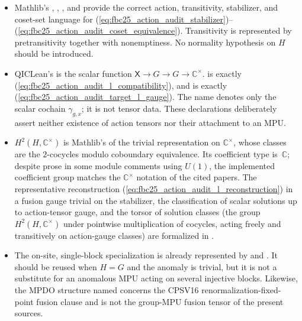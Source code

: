\documentclass{article}
\begin{document}
\begin{itemize}
    \item Mathlib's ,
          ,
          , and
           provide the correct
          action, transitivity, stabilizer, and coset-set language for
          (\ref{eq:fbc25_action_audit_stabilizer})--
          (\ref{eq:fbc25_action_audit_coset_equivalence}).  Transitivity is
          represented by pretransitivity together with nonemptiness.  No
          normality hypothesis on $H$ should be introduced.

    \item QICLean's  is the scalar function
          $\mathsf X\to G\to G\to\mathbb C^\times$.
           is exactly
          (\ref{eq:fbc25_action_audit_l_compatibility}), and
           is exactly
          (\ref{eq:fbc25_action_audit_target_l_gauge}).  The name
           denotes only the scalar
          cochain $\gamma_{g,x}$; it is not tensor data.  These declarations
          deliberately assert neither existence of action tensors nor their
          attachment to an MPU.

    \item $H^2(H,\mathbb C^\times)$ is Mathlib's
           of the trivial representation on
          $\mathbb C^\times$, whose classes are the $2$-cocycles modulo
          coboundary equivalence.
          Its coefficient type is \,$\mathbb C$; despite prose in
          some module comments using $U(1)$, the implemented coefficient
          group matches the $\mathbb C^\times$ notation of the cited papers.
          The representative reconstruction
          (\ref{eq:fbc25_action_audit_l_reconstruction}) in a fusion gauge
          trivial on the stabilizer, the classification of scalar solutions
          up to action-tensor gauge, and the torsor of solution classes (the
          group $H^2(H,\mathbb C^\times)$ under pointwise multiplication of
          cocycles, acting freely and transitively on action-gauge classes)
          are formalized in
          .

    \item The on-site, single-block specialization is already represented by
           and
          .  It should be
          reused when $H=G$ and the anomaly is trivial, but it is not a
          substitute for an anomalous MPU acting on several injective blocks.
          Likewise, the MPDO structure named
           concerns the CPSV16
          renormalization-fixed-point fusion clause and is not the group-MPU
          fusion tensor of the present sources.
\end{itemize}
\end{document}
